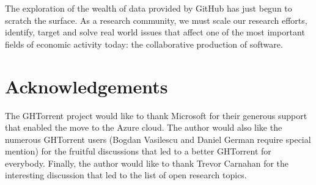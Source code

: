 \documentclass{sig-alternate}
\begin{document}
The exploration of the wealth of data provided by GitHub has just begun to
scratch the surface. As a research community, we must scale our research
efforts, identify, target and solve real world issues that affect one of the
most important fields of economic activity today: the collaborative production
of software.

\section*{Acknowledgements}

The GHTorrent project would like to thank Microsoft for their generous support
that enabled the move to the Azure cloud. The author would also like the
numerous GHTorrent users (Bogdan Vasilescu and Daniel German require special
mention) for the fruitful discussions that led to a better GHTorrent for
everybody. Finally, the author would like to thank Trevor Carnahan for
the interesting discussion that led to the list of open research topics.



\end{document}
